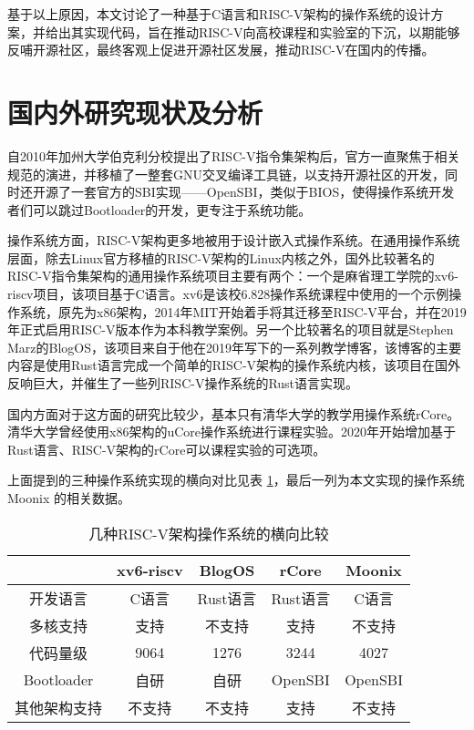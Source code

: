 基于以上原因，本文讨论了一种基于C语言和RISC-V架构的操作系统的设计方案，并给出其实现代码，旨在推动RISC-V向高校课程和实验室的下沉，以期能够反哺开源社区，最终客观上促进开源社区发展，推动RISC-V在国内的传播。

\section{国内外研究现状及分析}

自2010年加州大学伯克利分校提出了RISC-V指令集架构后，官方一直聚焦于相关规范的演进，并移植了一整套GNU交叉编译工具链，以支持开源社区的开发，同时还开源了一套官方的SBI实现——OpenSBI，类似于BIOS，使得操作系统开发者们可以跳过Bootloader的开发，更专注于系统功能。

操作系统方面，RISC-V架构更多地被用于设计嵌入式操作系统\cite{6481909}\cite{7496153}。在通用操作系统层面，除去Linux官方移植的RISC-V架构的Linux内核之外\cite{8965559}，国外比较著名的RISC-V指令集架构的通用操作系统项目主要有两个：一个是麻省理工学院的xv6-riscv项目，该项目基于C语言。xv6是该校6.828操作系统课程中使用的一个示例操作系统，原先为x86架构，2014年MIT开始着手将其迁移至RISC-V平台，并在2019年正式启用RISC-V版本作为本科教学案例。另一个比较著名的项目就是Stephen Marz的BlogOS，该项目来自于他在2019年写下的一系列教学博客，该博客的主要内容是使用Rust语言完成一个简单的RISC-V架构的操作系统内核，该项目在国外反响巨大，并催生了一些列RISC-V操作系统的Rust语言实现。

国内方面对于这方面的研究比较少，基本只有清华大学的教学用操作系统rCore。清华大学曾经使用x86架构的uCore操作系统进行课程实验。2020年开始增加基于Rust语言、RISC-V架构的rCore可以课程实验的可选项。

上面提到的三种操作系统实现的横向对比见表 \ref{tab:os-compare}，最后一列为本文实现的操作系统 Moonix 的相关数据。

\begin{table}[h]
	\centering
	\setlength{\belowcaptionskip}{2pt}
	\caption{几种RISC-V架构操作系统的横向比较}
	\label{tab:os-compare}
	\begin{tabular}{|c|c|c|c|c|}
		\hline
		& xv6-riscv & BlogOS & rCore & Moonix   \\ \hline
		开发语言       & C语言       & Rust语言 & Rust语言 & C语言  \\ \hline
		多核支持       & 支持        & 不支持    & 支持   & 不支持  \\ \hline
		代码量级       & 9064      & 1276   & 3244   & 4027  \\ \hline
		Bootloader & 自研        & 自研     & OpenSBI  & OpenSBI \\ \hline
		其他架构支持     & 不支持       & 不支持    & 支持    & 不支持   \\ \hline
	\end{tabular}
\end{table}

